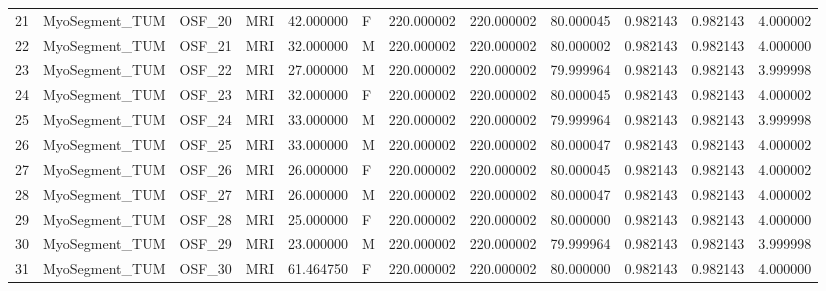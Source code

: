 \begin{tabular}{llllrlrrrrrr}
21     &  MyoSegment\_TUM &       OSF\_20 &                MRI &  42.000000 &        F &       220.000002 &    220.000002 &   80.000045 &               0.982143 &            0.982143 &          4.000002 \\
22     &  MyoSegment\_TUM &       OSF\_21 &                MRI &  32.000000 &        M &       220.000002 &    220.000002 &   80.000002 &               0.982143 &            0.982143 &          4.000000 \\
23     &  MyoSegment\_TUM &       OSF\_22 &                MRI &  27.000000 &        M &       220.000002 &    220.000002 &   79.999964 &               0.982143 &            0.982143 &          3.999998 \\
24     &  MyoSegment\_TUM &       OSF\_23 &                MRI &  32.000000 &        F &       220.000002 &    220.000002 &   80.000045 &               0.982143 &            0.982143 &          4.000002 \\
25     &  MyoSegment\_TUM &       OSF\_24 &                MRI &  33.000000 &        M &       220.000002 &    220.000002 &   79.999964 &               0.982143 &            0.982143 &          3.999998 \\
26     &  MyoSegment\_TUM &       OSF\_25 &                MRI &  33.000000 &        M &       220.000002 &    220.000002 &   80.000047 &               0.982143 &            0.982143 &          4.000002 \\
27     &  MyoSegment\_TUM &       OSF\_26 &                MRI &  26.000000 &        F &       220.000002 &    220.000002 &   80.000045 &               0.982143 &            0.982143 &          4.000002 \\
28     &  MyoSegment\_TUM &       OSF\_27 &                MRI &  26.000000 &        M &       220.000002 &    220.000002 &   80.000047 &               0.982143 &            0.982143 &          4.000002 \\
29     &  MyoSegment\_TUM &       OSF\_28 &                MRI &  25.000000 &        F &       220.000002 &    220.000002 &   80.000000 &               0.982143 &            0.982143 &          4.000000 \\
30     &  MyoSegment\_TUM &       OSF\_29 &                MRI &  23.000000 &        M &       220.000002 &    220.000002 &   79.999964 &               0.982143 &            0.982143 &          3.999998 \\
31     &  MyoSegment\_TUM &       OSF\_30 &                MRI &  61.464750 &        F &       220.000002 &    220.000002 &   80.000000 &               0.982143 &            0.982143 &          4.000000 \\

\end{tabular}
